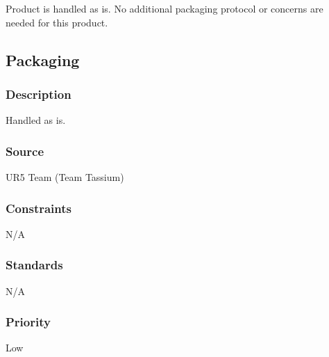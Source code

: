 Product is handled as is.  No additional packaging protocol or concerns are needed for this product.

\subsection{Packaging}
\subsubsection{Description}
Handled as is.
\subsubsection{Source}
UR5 Team (Team Tassium)
\subsubsection{Constraints}
N/A
\subsubsection{Standards}
N/A
\subsubsection{Priority}
Low